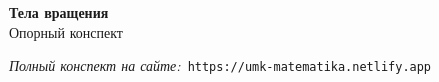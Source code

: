 \documentclass{umk-matematika}
\begin{document}
\begin{center}
{\Large\bfseries Тела вращения}
\\[0.3cm]{\large Опорный конспект}
\end{center}
\vspace{0.5cm}

\begin{center}
\textit{Полный конспект на сайте:}\
\texttt{https://umk-matematika.netlify.app}
\end{center}
\end{document}
